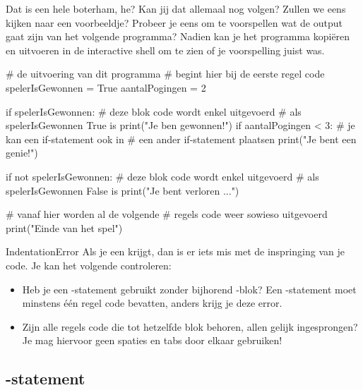 \begin{letsTryOut}
	Dat is een hele boterham, he?
	Kan jij dat allemaal nog volgen?
	Zullen we eens kijken naar een voorbeeldje?
	Probeer je eens om te voorspellen wat de output gaat zijn van het volgende programma?
	\newline
	Nadien kan je het programma kopiëren en uitvoeren in de interactive shell om te zien of je voorspelling juist was.
\begin{pyEnv}
# de uitvoering van dit programma
# begint hier bij de eerste regel code
spelerIsGewonnen = True
aantalPogingen = 2

if spelerIsGewonnen:
	# deze blok code wordt enkel uitgevoerd
	# als spelerIsGewonnen True is
	print("Je ben gewonnen!")
	if aantalPogingen < 3:
		# je kan een if-statement ook in
		# een ander if-statement plaatsen
		print("Je bent een genie!")

if not spelerIsGewonnen:
	# deze blok code wordt enkel uitgevoerd
	# als spelerIsGewonnen False is
	print("Je bent verloren ...")

# vanaf hier worden al de volgende
# regels code weer sowieso uitgevoerd
print("Einde van het spel")
\end{pyEnv}
\end{letsTryOut}

\begin{firstAidToErrors}{IndentationError}
	Als je een  krijgt, dan is er iets mis met de inspringing van je code.
	Je kan het volgende controleren:
	\begin{itemize}
		\item
			Heb je een -statement gebruikt zonder bijhorend -blok?
			Een -statement moet minstens één regel code bevatten,
			anders krijg je deze error.
		\item
			Zijn alle regels code die tot hetzelfde blok behoren, allen gelijk ingesprongen?
			Je mag hiervoor geen spaties en tabs door elkaar gebruiken!
	\end{itemize}
\end{firstAidToErrors}

\subsection{-statement}

